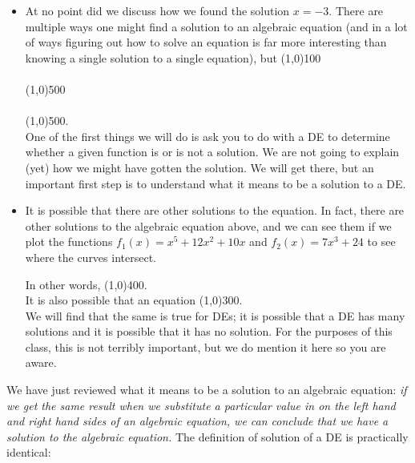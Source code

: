 \documentclass[12pt]{article}
\newcommand{\<}{\langle}
\renewcommand{\>}{\rangle}
\begin{document}
	\begin{itemize}
	\item  At no point did we discuss how we found the solution $x = -3.$  There are multiple ways one might find
		a solution to an algebraic equation (and in a lot of ways figuring out how to solve an equation is far more 
		interesting than knowing a single solution to a single equation),
		but %
		\line(1,0){100}\\ \\
		\line(1,0){500}\\ \\
			\line(1,0){500}.\\
		
		One of the first things we will do is ask you to do with a DE 
		to determine whether a given function is or is not a solution.  We are not going to explain (yet)
		how we might have gotten the solution.  We will get there, but an important first step is to understand what it
		means to be a solution to a DE.
		
	\item  It is possible that there are other solutions to the equation.  In fact, there are other solutions to the algebraic
		equation above, and we can see them if we plot the functions 
		$f_1(x) = x^5 + 12x^2 +10x$ and $f_2(x) = 7x^3 + 24$ to see where the curves intersect. 
		
		In other words, %
		\line(1,0){400}.\\
		It is also possible that an equation %
		\line(1,0){300}.\\
		
		We will find that the same is true for DEs; it is possible that a 
		DE has many solutions and it is possible that it has no solution.  For the purposes of this class, this 
		is not terribly important, but we do mention it here so you are aware.\\
	\end{itemize}

\noindent  We have just reviewed what it means to be a solution to an algebraic equation:  {\it if we get the same result 
when we substitute a particular value in on the left hand and right hand sides of an algebraic 
equation, we can conclude that we have a solution to the algebraic equation.}  The definition of solution of a DE
is practically identical:
	
\end{document}
